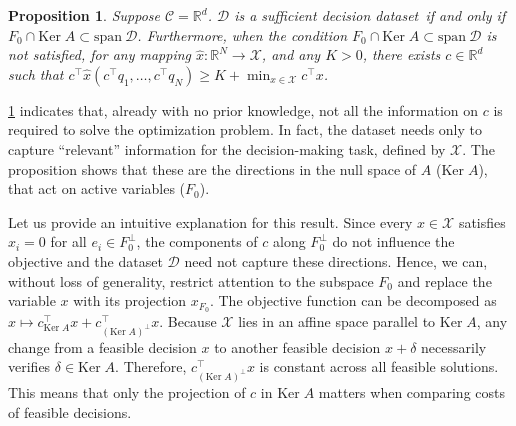 \documentclass[11pt]{article}
\theoremstyle{plain}
\newtheorem{proposition}{Proposition}
\theoremstyle{definition}
\newcommand{\R}[0]{\mathbb R}
\newcommand{\Ker}[0]{\mathrm{Ker}\;}
\newcommand{\Vect}{\mathrm{span}~}
\newcommand{\dataset}[0]{\mathcal D}
\newcommand{\sufficient}{sufficient decision dataset}
\newcommand{\suff}{sufficient}
\newcommand{\cX}{\mathcal{X}}
\newcommand{\cC}{\mathcal{C}}
\newcommand{\cD}{\mathcal{D}}
\renewcommand{\Re}{\mathbb{R}}
\begin{document}
\begin{proposition} 
 \label{prop:suff:vectorspace}
 Suppose $\cC = \Re^d$.
 $\dataset$ is a \sufficient\ if and only if $F_0 \cap \Ker A \subset \Vect \cD$.
Furthermore, when the condition $F_0 \cap \Ker A \subset \Vect \cD$ is not satisfied, for any mapping $\hat{x}:\R^N\longrightarrow \cX$, and any $K>0$, there exists $c\in \R^d$ such that $c^\top \hat{x}\left(c^\top q_1,\dots,c^\top q_N\right)\geq K + \min_{x\in \cX}c^\top x$. 
\end{proposition}


\cref{prop:suff:vectorspace} indicates that, already with no prior knowledge, not all the information on $c$ is required to solve the optimization problem. In fact, the dataset needs only to capture ``relevant'' information for the decision-making task, defined by $\cX$. The proposition shows that these are the directions in the null space of $A$ ($\Ker A$), that act on active variables ($F_0$). 

Let us provide an intuitive explanation for this result. Since every \(x \in \cX\) satisfies \(x_i = 0\) for all \(e_i \in F_0^\perp\), the components of \(c\) along \(F_0^\perp\) do not influence the objective and the dataset \(\cD\) need not capture these directions. Hence, we can, without loss of generality, restrict attention to the subspace \(F_0\) and replace the variable \(x\) with its projection \(x_{F_0}\). The objective function can be decomposed as $x\longmapsto c_{\Ker A}^\top x + c_{(\Ker A)^\perp}^\top x$. 
Because $\cX$ lies in an affine space parallel to \(\Ker A\), any change from a feasible decision $x$ to another feasible decision $x+\delta$ necessarily verifies $\delta \in \Ker A$.
Therefore, \(c_{(\Ker A)^\perp}^\top x\) is constant across all feasible solutions. This means that only the projection of $c$ in $\Ker A$ matters when comparing costs of feasible decisions.

\end{document}
